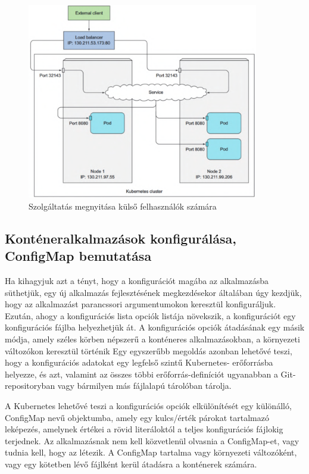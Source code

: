 \begin{figure}[ht]
    \centering
         \includegraphics[width=0.9\textwidth]{figures/kubernetes/service-overview.png}
          \caption{Szolgáltatás megnyitása külső felhasználók számára \cite{Marko17}}
           \label{service-overview}
\end{figure}

\subsection{Konténeralkalmazások konfigurálása, ConfigMap bemutatása}
Ha kihagyjuk azt a tényt, hogy a konfigurációt magába az alkalmazásba süthetjük, egy új alkalmazás fejlesztésének megkezdésekor általában úgy kezdjük, hogy az alkalmazást parancssori argumentumokon keresztül konfiguráljuk. Ezután, ahogy a konfigurációs lista opciók listája növekszik, a konfigurációt egy konfigurációs fájlba helyezhetjük át. A konfigurációs opciók átadásának egy másik módja, amely széles körben népszerű a konténeres alkalmazásokban, a környezeti változókon keresztül történik Egy egyszerűbb megoldás azonban lehetővé teszi, hogy a konfigurációs adatokat egy legfelső szintű Kubernetes- erőforrásba helyezze, és azt, valamint az összes többi erőforrás-definíciót ugyanabban a Git- repositoryban vagy bármilyen más fájlalapú tárolóban tárolja.

A Kubernetes lehetővé teszi a konfigurációs opciók elkülönítését egy különálló, ConfigMap nevű objektumba, amely egy kulcs/érték párokat tartalmazó leképezés, amelynek értékei a rövid literáloktól a teljes konfigurációs fájlokig terjednek. Az alkalmazásnak nem kell közvetlenül olvasnia a ConfigMap-et, vagy tudnia kell, hogy az létezik. A ConfigMap tartalma vagy környezeti változóként, vagy egy kötetben lévő fájlként kerül átadásra a konténerek számára.
\cite{Marko17}

